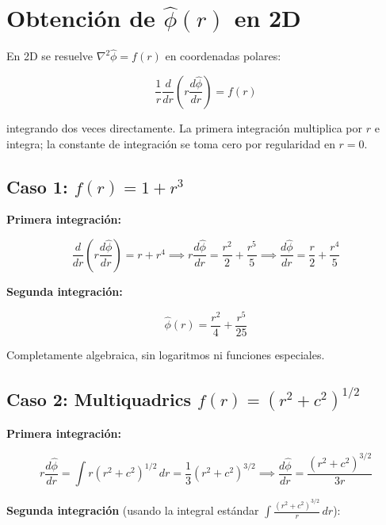 \documentclass[12pt,a4paper]{article}
\begin{document}
\section{Obtención de $\hat{\phi}(r)$ en 2D}

En 2D se resuelve $\nabla^2\hat{\phi} = f(r)$ en coordenadas polares:

\begin{equation}
    \frac{1}{r}\frac{d}{dr}\left(r\frac{d\hat{\phi}}{dr}\right) = f(r)
\end{equation}

integrando dos veces directamente. La primera integración multiplica por $r$ e
integra; la constante de integración se toma cero por regularidad en $r=0$.

\subsection{Caso 1: $f(r) = 1 + r^3$}

\textbf{Primera integración:}

\begin{equation}
    \frac{d}{dr}\left(r\frac{d\hat{\phi}}{dr}\right) = r + r^4
    \implies r\frac{d\hat{\phi}}{dr} = \frac{r^2}{2} + \frac{r^5}{5}
    \implies \frac{d\hat{\phi}}{dr} = \frac{r}{2} + \frac{r^4}{5}
\end{equation}

\textbf{Segunda integración:}

\begin{equation}
\boxed{
    \hat{\phi}(r) = \frac{r^2}{4} + \frac{r^5}{25}
}
\end{equation}

Completamente algebraica, sin logaritmos ni funciones especiales.

\subsection{Caso 2: Multiquadrics $f(r) = (r^2 + c^2)^{1/2}$}

\textbf{Primera integración:}

\begin{equation}
    r\frac{d\hat{\phi}}{dr} = \int r(r^2+c^2)^{1/2}\,dr
    = \frac{1}{3}(r^2+c^2)^{3/2}
    \implies \frac{d\hat{\phi}}{dr} = \frac{(r^2+c^2)^{3/2}}{3r}
\end{equation}

\textbf{Segunda integración} (usando la integral estándar
$\int \frac{(r^2+c^2)^{3/2}}{r}\,dr$):
\end{document}
